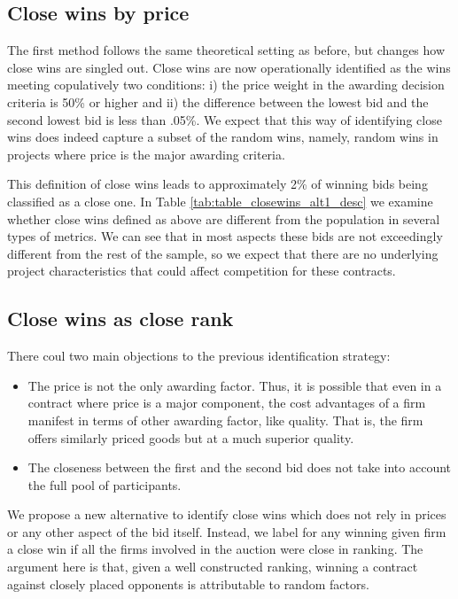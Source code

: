 \subsection{Close wins by price}
 The first method follows the same theoretical setting as before, but changes how close wins are singled out. Close wins are now operationally identified as the wins meeting copulatively  two conditions: i) the price weight in the awarding decision criteria is 50\% or higher and ii) the difference between the lowest bid and the second lowest bid is less than .05\%. We expect that this way of identifying close wins does indeed capture a subset of the random wins, namely, random wins in projects where price is the major awarding criteria.

This definition of close wins leads to approximately 2\% of winning bids being classified as a close one. In Table \ref{tab:table_closewins_alt1_desc} we examine whether close wins defined as above are different from the population in several types of metrics. We can see that in most aspects these bids are not exceedingly different from the rest of the sample, so we expect that there are no underlying project characteristics that could affect competition for these contracts.



\subsection{Close wins as close rank}
There coul two main objections to the previous identification strategy:
\begin{itemize}
  \item The price is not the only awarding factor. Thus, it is possible that even in a contract where price is a major component, the cost advantages of a firm manifest in terms of other awarding factor, like quality. That is, the firm offers similarly priced goods but at a much superior quality.
  \item The closeness between the first and the second bid does not take into account the full pool of participants.
\end{itemize}

We propose a new alternative to identify close wins which does not rely in prices or any other aspect of the bid itself. Instead, we label for any winning given firm a close win if all the firms involved in the auction were close in ranking. The argument here is that, given a well constructed ranking, winning a contract against closely placed opponents is attributable to random factors.

